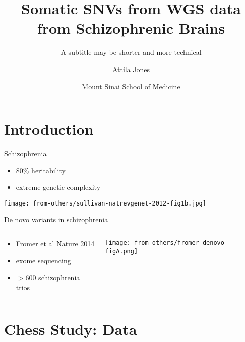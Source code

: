 \documentclass{beamer}
\title{Somatic SNVs from WGS data from Schizophrenic Brains}
\subtitle{A subtitle may be shorter and more technical}
\author{Attila Jones}
\date{Mount Sinai School of Medicine}
\begin{document}
\maketitle

\section{Introduction}

\begin{frame}{Schizophrenia}
\begin{itemize}
\item 80\% heritability
\item extreme genetic complexity
\end{itemize}
\texttt{[image: from-others/sullivan-natrevgenet-2012-fig1b.jpg]}
\end{frame}


\begin{frame}{De novo variants in schizophrenia}
\begin{columns}[t]
\begin{column}{0.5\textwidth}
\begin{itemize}
        \item Fromer et al Nature 2014
        \item exome sequencing
	\item \(>600\) schizophrenia trios
\end{itemize}
\end{column}

\begin{column}{0.5\textwidth}

\texttt{[image: from-others/fromer-denovo-figA.png]}
\end{column}
\end{columns}
\end{frame}

\section{Chess Study: Data}
\end{document}
